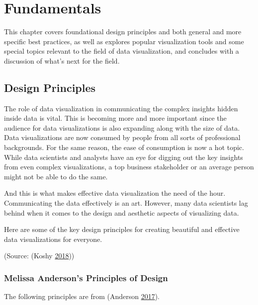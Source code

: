 \documentclass[]{book}
\begin{document}
\hypertarget{fundamentals}{%
\chapter{Fundamentals}\label{fundamentals}}

This chapter covers foundational design principles and both general and more specific best practices, as well as explores popular visualization tools and some special topics relevant to the field of data visualization, and concludes with a discussion of what's next for the field.

\hypertarget{design-principles}{%
\section{Design Principles}\label{design-principles}}

The role of data visualization in communicating the complex insights hidden inside data is vital. This is becoming more and more important since the audience for data visualizations is also expanding along with the size of data. Data visualizations are now consumed by people from all sorts of professional backgrounds. For the same reason, the ease of consumption is now a hot topic. While data scientists and analysts have an eye for digging out the key insights from even complex visualizations, a top business stakeholder or an average person might not be able to do the same.

And this is what makes effective data visualization the need of the hour. Communicating the data effectively is an art. However, many data scientists lag behind when it comes to the design and aesthetic aspects of visualizing data.

Here are some of the key design principles for creating beautiful and effective data visualizations for everyone.

(Source: (Koshy \protect\hyperlink{ref-promptcloud_2018}{2018}))

\hypertarget{melissa-andersons-principles-of-design}{%
\subsection{Melissa Anderson's Principles of Design}\label{melissa-andersons-principles-of-design}}

The following principles are from (Anderson \protect\hyperlink{ref-design_principles}{2017}).
\end{document}
